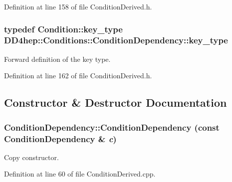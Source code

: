 Definition at line 158 of file ConditionDerived.h.\hypertarget{class_d_d4hep_1_1_conditions_1_1_condition_dependency_aeeb9606d1e1aae0a6eb4063ccfd1fca2}{
\subsubsection[{key\_\-type}]{\setlength{\rightskip}{0pt plus 5cm}typedef {\bf Condition::key\_\-type} {\bf DD4hep::Conditions::ConditionDependency::key\_\-type}}}
\label{class_d_d4hep_1_1_conditions_1_1_condition_dependency_aeeb9606d1e1aae0a6eb4063ccfd1fca2}


Forward definition of the key type. 

Definition at line 162 of file ConditionDerived.h.

\subsection{Constructor \& Destructor Documentation}
\hypertarget{class_d_d4hep_1_1_conditions_1_1_condition_dependency_ac121f9859fa375681429907880f99bc0}{
\subsubsection[{ConditionDependency}]{\setlength{\rightskip}{0pt plus 5cm}ConditionDependency::ConditionDependency (const {\bf ConditionDependency} \& {\em c})}}
\label{class_d_d4hep_1_1_conditions_1_1_condition_dependency_ac121f9859fa375681429907880f99bc0}


Copy constructor. 

Definition at line 60 of file ConditionDerived.cpp.

